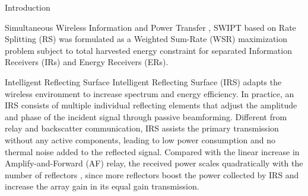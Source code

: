\documentclass[journal]{IEEEtran}
\begin{document}
\begin{section}{Introduction}
\begin{subsection}{Simultaneous Wireless Information and Power Transfer}
\cite{Mao2019}, SWIPT based on Rate Splitting (RS) was formulated as a Weighted Sum-Rate (WSR) maximization problem subject to total harvested energy constraint for separated Information Receivers (IRs) and Energy Receivers (ERs).
	\end{subsection}

	\begin{subsection}{Intelligent Reflecting Surface}
		Intelligent Reflecting Surface (IRS) adapts the wireless environment to increase spectrum and energy efficiency. In practice, an IRS consists of multiple individual reflecting elements that adjust the amplitude and phase of the incident signal through passive beamforming. Different from relay and backscatter communication, IRS assists the primary transmission without any active components, leading to low power consumption and no thermal noise added to the reflected signal. Compared with the linear increase in Amplify-and-Forward (AF) relay, the received power scales quadratically with the number of reflectors \cite{Wu2019}, since more reflectors boost the power collected by IRS and increase the array gain in its equal gain transmission.


\end{subsection}
\end{section}
\end{document}
